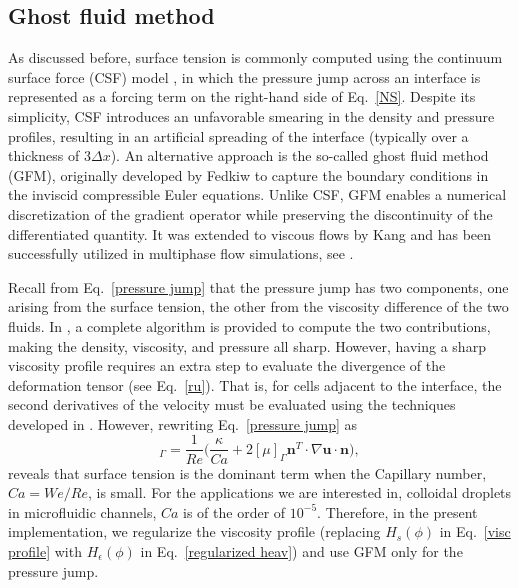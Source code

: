 

\subsection{Ghost fluid method}
\label{subsec: gfm}

As discussed before, surface tension is commonly computed using the continuum surface force (CSF) model \cite{Brackbill_JCP_1992}, in which the pressure jump across an interface is represented as a forcing term on the right-hand side of Eq.\ \eqref{NS}. Despite its simplicity, CSF introduces an unfavorable smearing in the density and pressure profiles, resulting in an artificial spreading of the interface (typically over a thickness of $3\Delta x$). An alternative approach is the so-called ghost fluid method (GFM), originally developed by Fedkiw \etal \cite{Fedkiw_JCP_1999} to capture the boundary conditions in the inviscid compressible Euler equations. Unlike CSF, GFM enables a numerical discretization of the gradient operator while preserving the discontinuity of the differentiated quantity. It was extended to viscous flows by Kang \etal \cite{Kang_JSC_2000} and has been successfully utilized in multiphase flow simulations, see \eg  \cite{Desjardins_JCP_2008, Coyajee_JCP_2009, Tanguy_2005}. 

Recall from Eq.\ \eqref{pressure jump} that the pressure jump has two components, one arising from the surface tension, the other from the viscosity difference of the two fluids. In \cite{Kang_JSC_2000}, a complete algorithm is provided to compute the two contributions, making the density, viscosity, and pressure all sharp. However, having a sharp viscosity profile requires an extra step to evaluate the divergence of the deformation tensor (see Eq.\ \eqref{ru}). That is, for cells adjacent to the interface, the second derivatives of the velocity must be evaluated using the techniques developed in \cite{Liu_JCP_2000, Kang_JSC_2000}. 
However, rewriting Eq.\ \eqref{pressure jump} as
\begin{equation}
    [p]_\Gamma = \frac{1}{Re} \bigg(\frac{\kappa}{Ca} + 2[\mu]_\Gamma {\bm n}^T \cdot \nabla {\bm u} \cdot {\bm n} \bigg),
  \label{pressure jump 2}
\end{equation}
\noindent reveals that surface tension is the dominant term when the Capillary number, $Ca=We/Re$, is small. For the applications we are interested in, \eg colloidal droplets in microfluidic channels, $Ca$ is of the order of $10^{-5}$. Therefore, in the present implementation, we regularize the viscosity profile (\ie replacing $H_s(\phi)$ in Eq.\ \eqref{visc profile} with $H_\epsilon(\phi)$ in Eq.\ \eqref{regularized heav}) and use GFM only for the pressure jump. 

